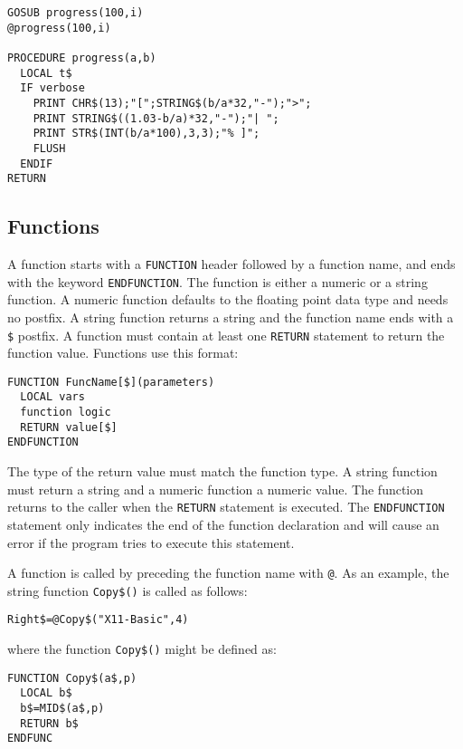 \begin{mdframed}[hidealllines=true,backgroundcolor=blue!20]
\begin{verbatim}
GOSUB progress(100,i)
@progress(100,i)

PROCEDURE progress(a,b)
  LOCAL t$
  IF verbose
    PRINT CHR$(13);"[";STRING$(b/a*32,"-");">";
    PRINT STRING$((1.03-b/a)*32,"-");"| ";
    PRINT STR$(INT(b/a*100),3,3);"% ]";
    FLUSH
  ENDIF
RETURN
\end{verbatim}
\end{mdframed}


\subsection{Functions}

A function starts with a \verb|FUNCTION| header followed by a function name,
and ends with the keyword \verb|ENDFUNCTION|. The function is either a numeric
or a string function. A numeric function defaults to the floating point data
type and needs no postfix. A string function returns a string and the function
name ends with a \verb|$| postfix. A function must contain at least one
\verb|RETURN| statement to return the function value. Functions use this
format:

\begin{verbatim}
FUNCTION FuncName[$](parameters)
  LOCAL vars
  function logic
  RETURN value[$]
ENDFUNCTION
\end{verbatim}

The type of the return value must match the function type. A string function
must return a string and a numeric function a numeric value. 
The function returns to the
caller when the \verb|RETURN| statement is executed. The \verb|ENDFUNCTION|
statement only indicates the end of the function declaration and will cause an
error if the program tries to execute this statement.

A function is called by preceding the function name with \verb|@|. As an
example, the string function \verb|Copy$()| is called as follows:

\begin{mdframed}[hidealllines=true,backgroundcolor=blue!20]
\begin{verbatim}
Right$=@Copy$("X11-Basic",4)
\end{verbatim}
\end{mdframed}
where the function \verb|Copy$()| might be defined as:
\begin{mdframed}[hidealllines=true,backgroundcolor=blue!20]
\begin{verbatim}
FUNCTION Copy$(a$,p)
  LOCAL b$
  b$=MID$(a$,p)
  RETURN b$
ENDFUNC
\end{verbatim}
\end{mdframed}

